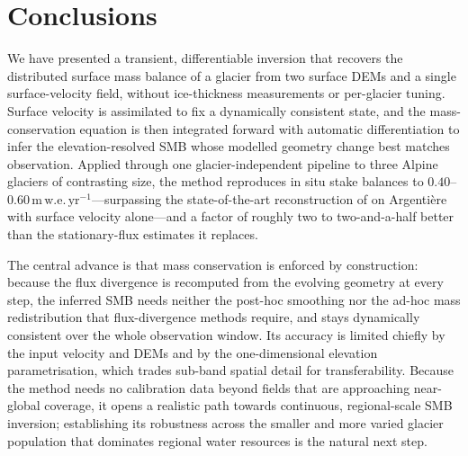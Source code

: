 \section{Conclusions}\label{sec:conclusions}

We have presented a transient, differentiable inversion that recovers the distributed
surface mass balance of a glacier from two surface DEMs and a single surface-velocity
field, without ice-thickness measurements or per-glacier tuning. Surface velocity is
assimilated to fix a dynamically consistent state, and the mass-conservation equation
is then integrated forward with automatic differentiation to infer the
elevation-resolved SMB whose modelled geometry change best matches observation.
Applied through one glacier-independent pipeline to three Alpine glaciers of
contrasting size, the method reproduces in situ stake balances to
$0.40$--$0.60\,\mathrm{m\,w.e.\,yr^{-1}}$---surpassing the state-of-the-art
reconstruction of \citet{kneib2024} on Argentière with surface velocity alone---and
a factor of roughly two to two-and-a-half better than the
stationary-flux estimates it replaces.

The central advance is that mass conservation is enforced by construction: because the
flux divergence is recomputed from the evolving geometry at every step, the inferred
SMB needs neither the post-hoc smoothing nor the ad-hoc mass redistribution that
flux-divergence methods require, and stays dynamically consistent over the whole
observation window. Its accuracy is limited chiefly by the input velocity and DEMs and
by the one-dimensional elevation parametrisation, which trades sub-band spatial detail
for transferability. Because the method needs no calibration data beyond fields that
are approaching near-global coverage, it opens a realistic path towards continuous,
regional-scale SMB inversion; establishing its robustness across the smaller and more
varied glacier population that dominates regional water resources is the natural next
step.
